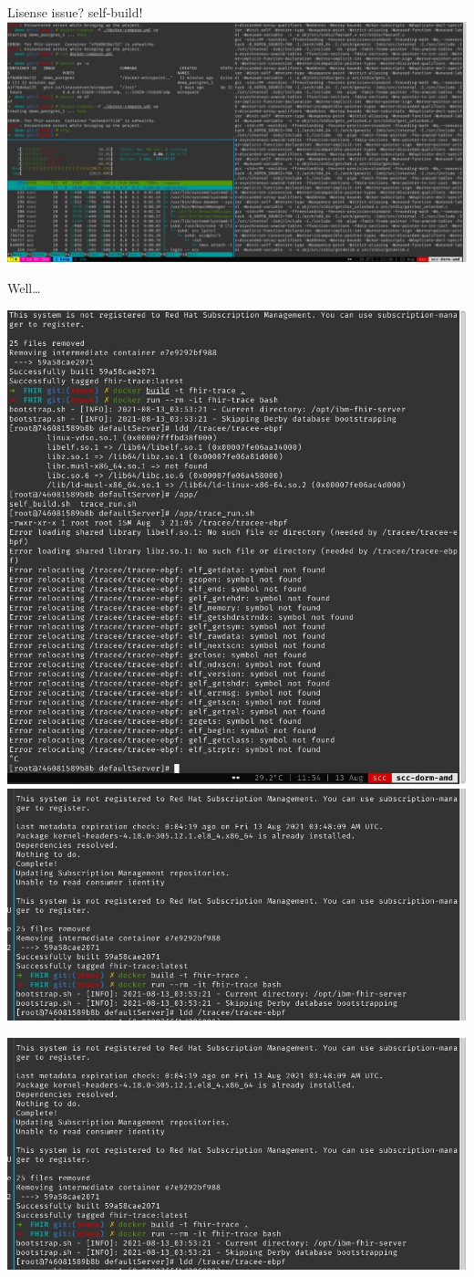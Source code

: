 \documentclass{beamer}
\begin{document}
\begin{CJK*}{UTF8}{bsmi}
  \begin{frame}{Lisense issue? self-build!}
    \includegraphics[width=\textwidth]{photo_2021-08-13_11-55-21.jpg}
  \end{frame}

  \begin{frame}{Well\dots}
    \begin{multicols*}{2}
      \includegraphics[width=.5\textwidth]{photo_2021-08-13_12-55-41.jpg}
      \includegraphics[width=.5\textwidth]{photo_2021-08-13_12-02-09.jpg}
    \end{multicols*}
  \end{frame}

  \begin{frame}
    \includegraphics[width=\textwidth]{photo_2021-08-13_12-02-09.jpg}
  \end{frame}


\end{CJK*}
\end{document}
